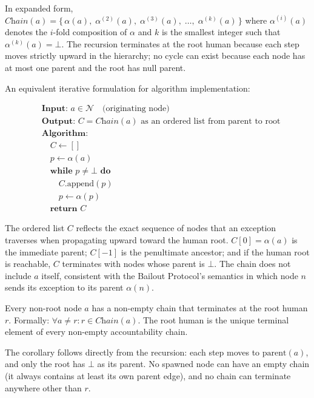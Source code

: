 In expanded form, $\textit{Chain}(a) = \{\,\alpha(a),\; \alpha^{(2)}(a),\; \alpha^{(3)}(a),\; \dots,\; \alpha^{(k)}(a)\,\}$ where $\alpha^{(i)}(a)$ denotes the $i$-fold composition of $\alpha$ and $k$ is the smallest integer such that $\alpha^{(k)}(a) = \bot$. The recursion terminates at the root human because each step moves strictly upward in the hierarchy; no cycle can exist because each node has at most one parent and the root has null parent.

An equivalent iterative formulation for algorithm implementation:

\begin{align}
& \textbf{Input: } a \in \mathcal{N} \quad \text{(originating node)} \tag{C-ITER} \\
& \textbf{Output: } C = \textit{Chain}(a) \text{ as an ordered list from parent to root} \\
& \textbf{Algorithm:} \\
& \quad C \leftarrow [] \\
& \quad p \leftarrow \alpha(a) \\
& \quad \textbf{while } p \neq \bot \textbf{ do} \\
& \qquad C.\text{append}(p) \\
& \qquad p \leftarrow \alpha(p) \\
& \quad \textbf{return } C
\end{align}

The ordered list $C$ reflects the exact sequence of nodes that an exception traverses when propagating upward toward the human root. $C[0] = \alpha(a)$ is the immediate parent; $C[-1]$ is the penultimate ancestor; and if the human root is reachable, $C$ terminates with nodes whose parent is $\bot$. The chain does not include $a$ itself, consistent with the Bailout Protocol's semantics in which node $n$ sends its exception to its parent $\alpha(n)$.

\begin{corrollary}
Every non-root node $a$ has a non-empty chain that terminates at the root human $r$. Formally: $\forall a \neq r: r \in \textit{Chain}(a)$. The root human is the unique terminal element of every non-empty accountability chain.
\end{corrollary}

The corollary follows directly from the recursion: each step moves to $\text{parent}(a)$, and only the root has $\bot$ as its parent. No spawned node can have an empty chain (it always contains at least its own parent edge), and no chain can terminate anywhere other than $r$.

